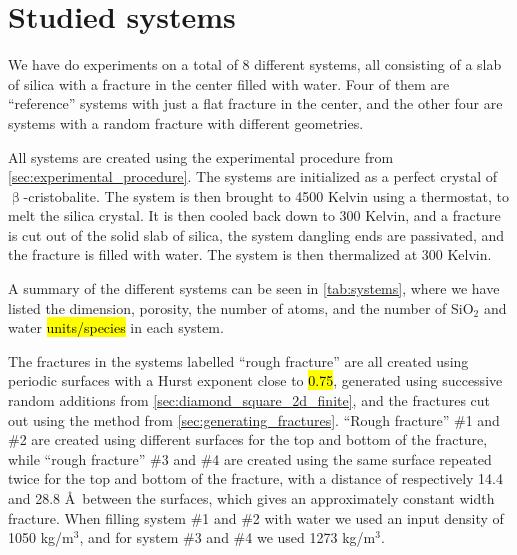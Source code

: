 \chapter{Studied systems}
%
%
%
We have do experiments on a total of 8 different systems, all consisting of a slab of silica with a fracture in the center filled with water. Four of them are ``reference'' systems with just a flat fracture in the center, and the other four are systems with a random fracture with different geometries.

All systems are created using the experimental procedure from \cref{sec:experimental_procedure}. The systems are initialized as a perfect crystal of $\upbeta$-cristobalite. The system is then brought to 4500 Kelvin using a thermostat, to melt the silica crystal. It is then cooled back down to 300 Kelvin, and a fracture is cut out of the solid slab of silica, the system dangling ends are passivated, and the fracture is filled with water. The system is then thermalized at 300 Kelvin.

A summary of the different systems can be seen in \cref{tab:systems}, where we have listed the dimension, porosity, the number of atoms, and the number of SiO$_2$ and water \hl{units/species} in each system.

The fractures in the systems labelled ``rough fracture'' are all created using periodic surfaces with a Hurst exponent close to \hl{0.75}, generated using successive random additions from \cref{sec:diamond_square_2d_finite}, and the fractures cut out using the method from \cref{sec:generating_fractures}. ``Rough fracture'' \#1 and \#2 are created using different surfaces for the top and bottom of the fracture, while ``rough fracture'' \#3 and \#4 are created using the same surface repeated twice for the top and bottom of the fracture, with a distance of respectively 14.4 and 28.8 \AA\ between the surfaces, which gives an approximately constant width fracture. When filling system \#1 and \#2 with water we used an input density of 1050 kg/m$^3$, and for system \#3 and \#4 we used 1273 kg/m$^3$.


